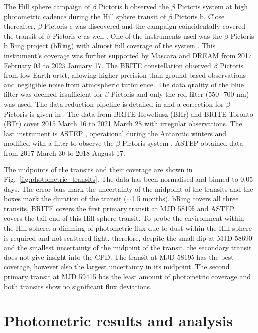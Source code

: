 \documentclass{aa}
\newcommand\picb{$\beta$ Pictoris b}
\newcommand\picc{$\beta$ Pictoris c}
\newcommand\pic{$\beta$ Pictoris}
\begin{document}
The Hill sphere campaign of \picb{} \citep{Kenworthy_2021} observed the \pic{} system at high photometric cadence during the Hill sphere transit of \picb{}.
%
Close thereafter, \picc{} was discovered and the campaign coincidentally covered the transit of \picc{} as well \citep{Stuik_2017}. 
%
One of the instruments used was the \pic{} b Ring project (bRing) with almost full coverage of the system \citep{Snellen_2012,Snellen_2013,Stuik_2014, Stuik_2016,Talens_2017,Talens_2018}.
%
This instrument's coverage was further supported by Mascara and DREAM from 2017 February 03 to 2023 January 17.
%
The BRITE constellation \citep[BRIght Target Explorer; ][]{Weiss_2014} observed \pic{} from low Earth orbit, allowing higher precision than ground-based observations and negligible noise from atmospheric turbulence.  
%
The data quality of the blue filter was deemed insufficient for \pic{} \citep{Zwintz_2019} and only the red filter (550 -700 nm) was used. 
%
The data reduction pipeline is detailed in \citet{Popowic_2017} and a correction for \pic{} is given in \citet{Zwintz_2019}. 
%
The data from BRITE-Heweliusz (BHr) and BRITE-Toronto (BTr) cover 2015 March 16 to 2021 March 28 with irregular observations. 
%
The last instrument is ASTEP \citep{Crouzet_2010}, operational during the Antarctic winters and modified with a filter to observe the \pic{} system \citep{Kenworthy_2021}. 
%
ASTEP obtained data from 2017 March 30 to 2018 August 17.

The midpoints of the transits and their coverage are shown in Fig.~\ref{fig:photometric_transits}. 
%
The data has been normalised and binned to 0.05 days.
%
The error bars mark the uncertainty of the midpoint of the transits and the boxes mark the duration of the transit ($\sim$1.5 months). 
%
bRing covers all three transits, BRITE covers the first primary transit at MJD 58195 and ASTEP covers the tail end of this Hill sphere transit.
%
To probe the environment within the Hill sphere, a dimming of photometric flux due to dust within the Hill sphere is required and not scattered light, therefore, despite the small dip at MJD 58690 and the smallest uncertainty of the midpoint of the transit, the secondary transit does not give insight into the CPD.
%
The transit at MJD 58195 has the best coverage, however also the largest uncertainty in its midpoint.
%
The second primary transit at MJD 59415 has the least amount of photometric coverage and both transits show no significant flux deviations. 
\section{Photometric results and analysis}\label{sec:Photo_Results}
\end{document}
